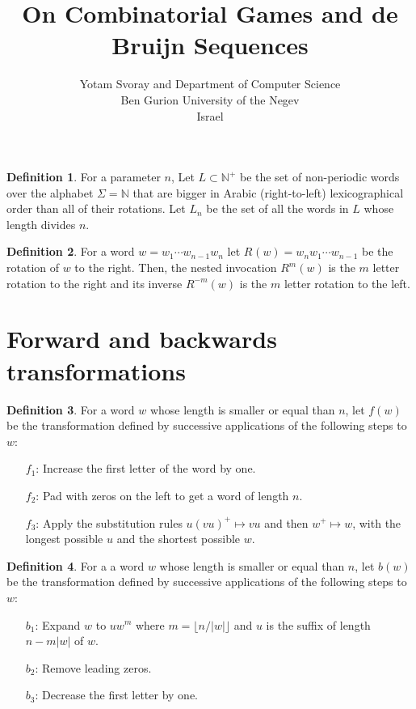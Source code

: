 \documentclass{article}
\title{On Combinatorial Games and de Bruijn Sequences}
\author{Yotam Svoray and %
Department of Computer Science \\
Ben Gurion University of the Negev\\
Israel
}
\theoremstyle{definition}
\newtheorem{definition}{Definition}
\newcommand{\N}{{\mathbb{N}}}
\newcommand{\rr}[2]{R^{#2}({#1})}
\newcommand{\rl}[2]{R^{-{#2}}({#1})}
\begin{document}
\begin{definition}
	For a parameter $n$, Let $L \subset \N^+$ be the set of non-periodic words over the alphabet $\Sigma=\N$ that are bigger in Arabic (right-to-left) lexicographical order than all of their rotations. Let $L_n$ be the set of all the words in $L$ whose length divides $n$.
\end{definition}


\begin{definition}
	For a word $w=w_1\cdots w_{n-1}w_n$ let  $\rr{w}{}= w_{n}w_1\cdots w_{n-1}$ be the rotation of $w$ to the right. Then, the nested invocation $\rr{w}{m}$ is the $m$ letter rotation to the right and its inverse $\rl{w}{m}$ is the $m$ letter rotation to the left.
\end{definition}

	
\section{Forward and backwards transformations}


\begin{definition}\label{forward}
For a word $w$ whose length is smaller or equal than $n$, let  $f(w)$ be the transformation defined by successive applications of the following steps to $w$:
\begin{enumerate}
	\item[$f_1$:] Increase the first letter of the word by one. 
	\item[$f_2$:] Pad with zeros on the left to get a word of length $n$.
	\item[$f_3$:] Apply the substitution rules $u(vu)^+ \mapsto vu$ and then $w^+ \mapsto w$, with the longest possible $u$ and the shortest possible $w$.
\end{enumerate}
\end{definition}

\begin{definition}\label{backward}
For a a word $w$ whose length is smaller or equal than $n$, let  $b(w)$ be the transformation defined by successive applications of the following steps to $w$:
\begin{enumerate}
	\item[$b_1$:] Expand $w$ to $u w^m$ where $m=\lfloor n/ |w| \rfloor$ and $u$ is the suffix of length $n-m|w|$ of $w$.
	
	\item[$b_2$:] Remove leading zeros.
	\item[$b_3$:] Decrease the first letter by one.
\end{enumerate}
\end{definition}
\end{document}
